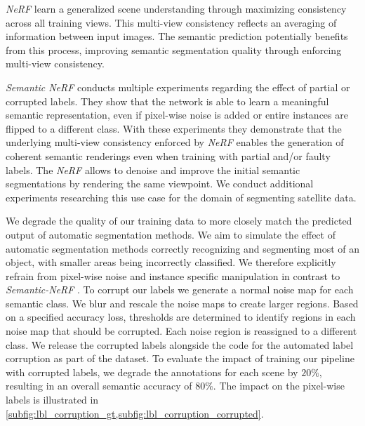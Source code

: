 \emph{NeRF} learn a generalized scene understanding through maximizing consistency across all training views. 
This multi-view consistency reflects an averaging of information between input images. 
The semantic prediction potentially benefits from this process, improving semantic segmentation quality through enforcing multi-view consistency.

\emph{Semantic NeRF} \cite{semanticnerf} conducts multiple experiments regarding the effect of partial or corrupted labels. 
They show that the network is able to learn a meaningful semantic representation, even if pixel-wise noise is added or entire instances are flipped to a different class. 
With these experiments they demonstrate that the underlying multi-view consistency enforced by \emph{NeRF} enables the generation of coherent semantic renderings even when training with partial and/or faulty labels. 
The \emph{NeRF} allows to denoise and improve the initial semantic segmentations by rendering the same viewpoint. 
We conduct additional experiments researching this use case for the domain of segmenting satellite data.

We degrade the quality of our training data to more closely match the predicted output of automatic segmentation methods. 
We aim to simulate the effect of automatic segmentation methods correctly recognizing and segmenting most of an object, with smaller areas being incorrectly classified. 
We therefore explicitly refrain from pixel-wise noise and instance specific manipulation in contrast to \emph{Semantic-NeRF} \cite{semanticnerf}.
To corrupt our labels we generate a normal noise map for each semantic class. 
We blur and rescale the noise maps to create larger regions.  
Based on a specified accuracy loss, thresholds are determined to identify regions in each noise map that should be corrupted. 
Each noise region is reassigned to a different class.  
We release the corrupted labels alongside the code for the automated label corruption as part of the dataset.
To evaluate the impact of training our pipeline with corrupted labels, we degrade the annotations for each scene by $20\%$, resulting in an overall semantic accuracy of $80\%$. 
The impact on the pixel-wise labels is illustrated in \cref{subfig:lbl_corruption_gt,subfig:lbl_corruption_corrupted}.


